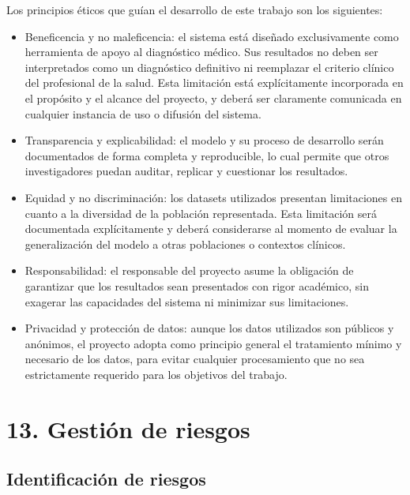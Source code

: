 \documentclass[
11pt, %
]{charter}
\begin{document}
Los principios éticos que guían el desarrollo de este trabajo son los siguientes:
\begin{itemize}
  \item Beneficencia y no maleficencia: el sistema está diseñado exclusivamente como herramienta de apoyo al diagnóstico médico. 
        Sus resultados no deben ser interpretados como un diagnóstico definitivo ni reemplazar el criterio clínico del profesional de la salud. 
        Esta limitación está explícitamente incorporada en el propósito y el alcance del proyecto, y deberá ser claramente comunicada en cualquier 
        instancia de uso o difusión del sistema.
  \item Transparencia y explicabilidad: el modelo y su proceso de desarrollo serán documentados de forma completa y reproducible, lo cual permite 
        que otros investigadores puedan auditar, replicar y cuestionar los resultados.
  \item Equidad y no discriminación: los datasets utilizados presentan limitaciones en cuanto a la diversidad de la población representada. 
        Esta limitación será documentada explícitamente y deberá considerarse al momento de evaluar la generalización del modelo a otras poblaciones 
        o contextos clínicos.
  \item Responsabilidad: el responsable del proyecto asume la obligación de garantizar que los resultados sean presentados con rigor académico, 
        sin exagerar las capacidades del sistema ni minimizar sus limitaciones.
  \item Privacidad y protección de datos: aunque los datos utilizados son públicos y anónimos, el proyecto adopta como principio general el 
        tratamiento mínimo y necesario de los datos, para evitar cualquier procesamiento que no sea estrictamente requerido para los objetivos del trabajo.
\end{itemize}

\section{13. Gestión de riesgos}
\label{sec:riesgos}

\subsection{Identificación de riesgos}
\end{document}
